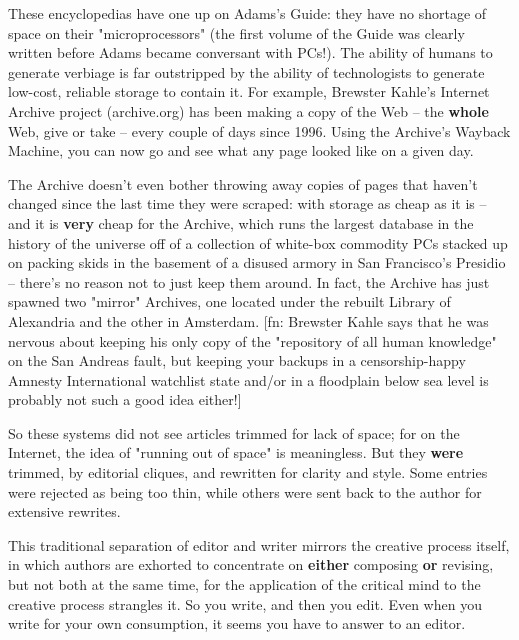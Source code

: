 These encyclopedias have one up on Adams's Guide: they have no
shortage of space on their "microprocessors" (the first volume of
the Guide was clearly written before Adams became conversant with
PCs!). The ability of humans to generate verbiage is far
outstripped by the ability of technologists to generate low-cost,
reliable storage to contain it. For example, Brewster Kahle's
Internet Archive project (archive.org) has been making a copy of
the Web -- the \textbf{whole} Web, give or take -- every couple of
days since 1996. Using the Archive's Wayback Machine, you can now
go and see what any page looked like on a given day.

The Archive doesn't even bother throwing away copies of pages that
haven't changed since the last time they were scraped: with storage
as cheap as it is -- and it is \textbf{very} cheap for the Archive,
which runs the largest database in the history of the universe off
of a collection of white-box commodity PCs stacked up on packing
skids in the basement of a disused armory in San Francisco's
Presidio -- there's no reason not to just keep them around. In
fact, the Archive has just spawned two "mirror" Archives, one
located under the rebuilt Library of Alexandria and the other in
Amsterdam. [fn: Brewster Kahle says that he was nervous about
keeping his only copy of the "repository of all human knowledge" on
the San Andreas fault, but keeping your backups in a
censorship-happy Amnesty International watchlist state and/or in a
floodplain below sea level is probably not such a good idea
either!]

So these systems did not see articles trimmed for lack of space;
for on the Internet, the idea of "running out of space" is
meaningless. But they \textbf{were} trimmed, by editorial cliques,
and rewritten for clarity and style. Some entries were rejected as
being too thin, while others were sent back to the author for
extensive rewrites.

This traditional separation of editor and writer mirrors the
creative process itself, in which authors are exhorted to
concentrate on \textbf{either} composing \textbf{or} revising, but
not both at the same time, for the application of the critical mind
to the creative process strangles it. So you write, and then you
edit. Even when you write for your own consumption, it seems you
have to answer to an editor.

